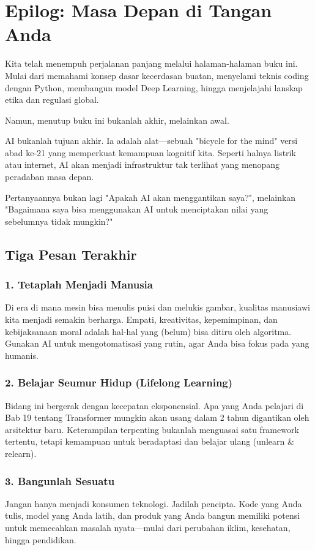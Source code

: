 \chapter*{Epilog: Masa Depan di Tangan Anda}

Kita telah menempuh perjalanan panjang melalui halaman-halaman buku ini. Mulai dari memahami konsep dasar kecerdasan buatan, menyelami teknis coding dengan Python, membangun model Deep Learning, hingga menjelajahi lanskap etika dan regulasi global.

Namun, menutup buku ini bukanlah akhir, melainkan awal.

AI bukanlah tujuan akhir. Ia adalah alat—sebuah "bicycle for the mind" versi abad ke-21 yang memperkuat kemampuan kognitif kita. Seperti halnya listrik atau internet, AI akan menjadi infrastruktur tak terlihat yang menopang peradaban masa depan.

Pertanyaannya bukan lagi "Apakah AI akan menggantikan saya?", melainkan "Bagaimana saya bisa menggunakan AI untuk menciptakan nilai yang sebelumnya tidak mungkin?"

\section*{Tiga Pesan Terakhir}

\subsection*{1. Tetaplah Menjadi Manusia}
Di era di mana mesin bisa menulis puisi dan melukis gambar, kualitas manusiawi kita menjadi semakin berharga. Empati, kreativitas, kepemimpinan, dan kebijaksanaan moral adalah hal-hal yang (belum) bisa ditiru oleh algoritma. Gunakan AI untuk mengotomatisasi yang rutin, agar Anda bisa fokus pada yang humanis.

\subsection*{2. Belajar Seumur Hidup (Lifelong Learning)}
Bidang ini bergerak dengan kecepatan eksponensial. Apa yang Anda pelajari di Bab 19 tentang Transformer mungkin akan usang dalam 2 tahun digantikan oleh arsitektur baru. Keterampilan terpenting bukanlah menguasai satu framework tertentu, tetapi kemampuan untuk beradaptasi dan belajar ulang (unlearn \& relearn).

\subsection*{3. Bangunlah Sesuatu}
Jangan hanya menjadi konsumen teknologi. Jadilah pencipta. Kode yang Anda tulis, model yang Anda latih, dan produk yang Anda bangun memiliki potensi untuk memecahkan masalah nyata—mulai dari perubahan iklim, kesehatan, hingga pendidikan.

